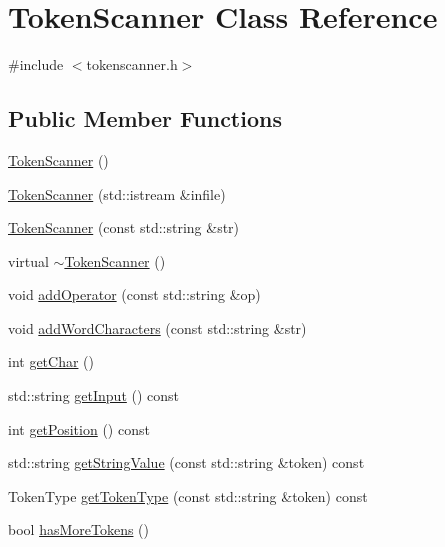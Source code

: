 \hypertarget{classTokenScanner}{}\section{Token\+Scanner Class Reference}
\label{classTokenScanner}


{\ttfamily \#include $<$tokenscanner.\+h$>$}

\subsection*{Public Member Functions}
\begin{DoxyCompactItemize}
\item 
\mbox{\hyperlink{classTokenScanner_a284595cf3c3df7d3e70ef2dcdc1f0292}{Token\+Scanner}} ()
\item 
\mbox{\hyperlink{classTokenScanner_aa82b5fa6beae663f87eaa0ae964a48b3}{Token\+Scanner}} (std\+::istream \&infile)
\item 
\mbox{\hyperlink{classTokenScanner_a55859460fe8f07596fbc93d91314254a}{Token\+Scanner}} (const std\+::string \&str)
\item 
virtual \mbox{\hyperlink{classTokenScanner_a38bfeb2d700fbb486f5b3a4283419ae5}{$\sim$\+Token\+Scanner}} ()
\item 
void \mbox{\hyperlink{classTokenScanner_a5256bb7e66b4509946204727182994f9}{add\+Operator}} (const std\+::string \&op)
\item 
void \mbox{\hyperlink{classTokenScanner_aed3e8321a04deee5d8bebce0d6d715ac}{add\+Word\+Characters}} (const std\+::string \&str)
\item 
int \mbox{\hyperlink{classTokenScanner_aa1ac28f13062f093eb32a49dce4c63f8}{get\+Char}} ()
\item 
std\+::string \mbox{\hyperlink{classTokenScanner_ae2c34694d98dc66a7493339061a4358e}{get\+Input}} () const
\item 
int \mbox{\hyperlink{classTokenScanner_a6c9c9aa34f1ae28cd7a4f150e2df8201}{get\+Position}} () const
\item 
std\+::string \mbox{\hyperlink{classTokenScanner_ac9f2b60ecc3007903307c3cb49fd5df1}{get\+String\+Value}} (const std\+::string \&token) const
\item 
Token\+Type \mbox{\hyperlink{classTokenScanner_a50ed7613c93d2b3618830c3c5a4341ca}{get\+Token\+Type}} (const std\+::string \&token) const
\item 
bool \mbox{\hyperlink{classTokenScanner_af690597352ca6f48a9f86b527cd754da}{has\+More\+Tokens}} ()
\item 

\end{DoxyCompactItemize}
